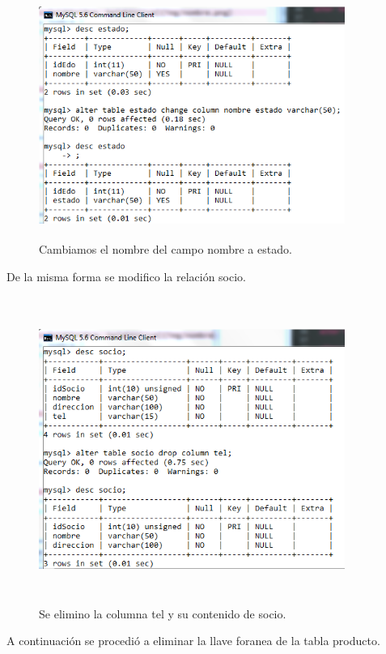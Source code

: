 \documentclass[12pt, titlepage]{article}
\begin{document}
\begin{figure}[H]
    \begin{center}
        \includegraphics[width=10cm, height=8cm]{img/change.png}
        \caption{Cambiamos el nombre del campo nombre a estado.}
        \label{fig:arlter90}
    \end{center}
\end{figure}
De la misma forma se modifico la relación socio.
\begin{figure}[H]
    \begin{center}
        \includegraphics[width=10cm, height=10cm]{img/socio.png}
        \caption{Se elimino la columna tel y su contenido de socio.}
        \label{fig:arlter777}
    \end{center}
\end{figure}
A continuación se procedió a eliminar la llave foranea de la tabla producto.
\end{document}
